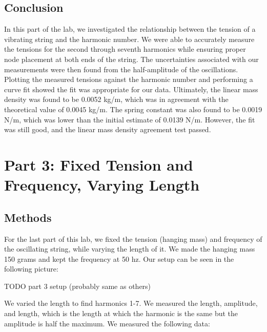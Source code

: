 \documentclass[11pt]{article}
\let\oldsection\section
\renewcommand\section{\clearpage\oldsection}
\begin{document}
    \subsection{Conclusion}\label{subsec:part_2_conclusion}

    In this part of the lab, we investigated the relationship between the tension of a vibrating string and the harmonic number.
    We were able to accurately measure the tensions for the second through seventh harmonics while ensuring proper node placement at both ends of the string.
    The uncertainties associated with our measurements were then found from the half-amplitude of the oscillations.
    Plotting the measured tensions against the harmonic number and performing a curve fit showed the fit was appropriate for our data.
    Ultimately, the linear mass density was found to be 0.0052  kg/m, which was in agreement with the theoretical value of 0.0045  kg/m.
    The spring constant was also found to be 0.0019 N/m, which was lower than the initial estimate of 0.0139 N/m.
    However, the fit was still good, and the linear mass density agreement test passed.


    \section{Part 3: Fixed Tension and Frequency, Varying Length}\label{sec:part_3}

    \subsection{Methods}\label{subsec:part_3_methods}
    For the last part of this lab, we fixed the tension (hanging mass) and frequency of the oscillating string, while varying the length of it. We made the hanging mass 150 grams and kept the frequency at 50 hz. Our setup can be seen in the following picture:

    TODO part 3 setup (probably same as others)

    We varied the length to find harmonics 1-7. We measured the length, amplitude, and length, which is the length at which the harmonic is the same but the amplitude is half the maximum. We measured the following data:
\end{document}
